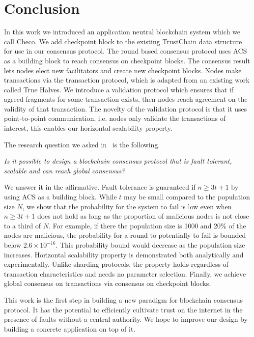 \chapter{Conclusion}
\label{ch:conclusion}

In this work we introduced an application neutral blockchain system which we call Checo.
We add checkpoint block to the existing TrustChain data structure for use in our consensus protocol.
The round based consensus protocol uses ACS as a building block to reach consensus on checkpoint blocks.
The consensus result lets nodes elect new facilitators and create new checkpoint blocks.
Nodes make transactions via the transaction protocol,
which is adapted from an existing work called True Halves.
We introduce a validation protocol which ensures that if agreed fragments for some transaction exists,
then nodes reach agreement on the validity of that transaction.
The novelty of the validation protocol is that it uses point-to-point communication,
i.e. nodes only validate the transactions of interest,
this enables our horizontal scalability property.

The research question we asked in~ is the following.
\begin{displayquote}
\emph{Is it possible to design a blockchain consensus protocol that is fault tolerant, scalable and can reach global consensus?}
\end{displayquote}
We answer it in the affirmative.
Fault tolerance is guaranteed if $n \ge 3t + 1$ by using ACS as a building block.
While $t$ may be small compared to the population size $N$,
we show that the probability for the system to fail is low even when $n \ge 3t + 1$ does not hold as long as the proportion of malicious nodes is not close to a third of $N$.
For example, if there the population size is 1000 and 20\% of the nodes are malicious,
the probability for a round to potentially to fail is bounded below $2.6 \times 10^{-16}$.
This probability bound would decrease as the population size increases.
Horizontal scalability property is demonstrated both analytically and experimentally.
Unlike sharding protocols, the property holds regardless of transaction characteristics and needs no parameter selection.
Finally, we achieve global consensus on transactions via consensus on checkpoint blocks.

This work is the first step in building a new paradigm for blockchain consensus protocol.
It has the potential to efficiently cultivate trust on the internet in the presence of faults without a central authority.
We hope to improve our design by building a concrete application on top of it.

